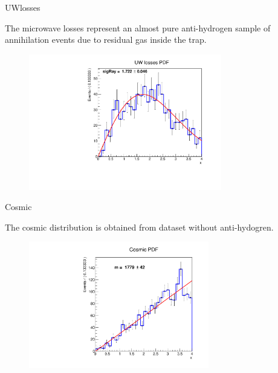 \documentclass[9pt]{beamer}
\begin{document}
\begin{frame}{UWlosses}

The microwave losses represent an almost pure anti-hydrogen sample of annihilation events due to residual gas inside the trap.

\begin{figure}
\includegraphics[width = 0.75\textwidth]{./SingleModel/FitToUW.pdf}
\end{figure}

\end{frame}

\begin{frame}{Cosmic}

The cosmic distribution is obtained from dataset without anti-hydogren. 

\begin{figure}
\includegraphics[width = 0.7\textwidth]{./SingleModel/Cosmici_fit.pdf}
\end{figure}

\end{frame}
\end{document}
